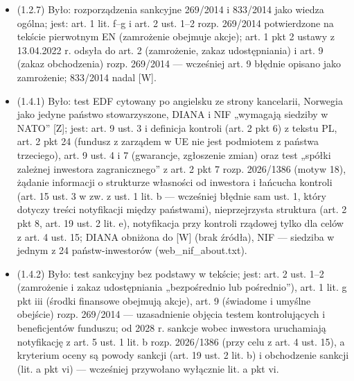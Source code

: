 \documentclass[12pt,a4paper]{report}
\begin{document}
\begin{itemize}
  \item (1.2.7) Było: rozporządzenia sankcyjne 269/2014 i 833/2014 jako wiedza ogólna; jest: art. 1 lit. f–g i art. 2 ust. 1–2 rozp. 269/2014 potwierdzone na tekście pierwotnym EN (zamrożenie obejmuje akcje); art. 1 pkt 2 ustawy z 13.04.2022 r. odsyła do art. 2 (zamrożenie, zakaz udostępniania) i art. 9 (zakaz obchodzenia) rozp. 269/2014 — wcześniej art. 9 błędnie opisano jako zamrożenie; 833/2014 nadal [W].
  \item (1.4.1) Było: test EDF cytowany po angielsku ze strony kancelarii, Norwegia jako jedyne państwo stowarzyszone, DIANA i NIF „wymagają siedziby w NATO” [Z]; jest: art. 9 ust. 3 i definicja kontroli (art. 2 pkt 6) z tekstu PL, art. 2 pkt 24 (fundusz z zarządem w UE nie jest podmiotem z państwa trzeciego), art. 9 ust. 4 i 7 (gwarancje, zgłoszenie zmian) oraz test „spółki zależnej inwestora zagranicznego” z art. 2 pkt 7 rozp. 2026/1386 (motyw 18), żądanie informacji o strukturze własności od inwestora i łańcucha kontroli (art. 15 ust. 3 w zw. z ust. 1 lit. b — wcześniej błędnie sam ust. 1, który dotyczy treści notyfikacji między państwami), nieprzejrzysta struktura (art. 2 pkt 8, art. 19 ust. 2 lit. e), notyfikacja przy kontroli rządowej tylko dla celów z art. 4 ust. 15; DIANA obniżona do [W] (brak źródła), NIF — siedziba w jednym z 24 państw-inwestorów (web\_nif\_about.txt).
  \item (1.4.2) Było: test sankcyjny bez podstawy w tekście; jest: art. 2 ust. 1–2 (zamrożenie i zakaz udostępniania „bezpośrednio lub pośrednio”), art. 1 lit. g pkt iii (środki finansowe obejmują akcje), art. 9 (świadome i umyślne obejście) rozp. 269/2014 — uzasadnienie objęcia testem kontrolujących i beneficjentów funduszu; od 2028 r. sankcje wobec inwestora uruchamiają notyfikację z art. 5 ust. 1 lit. b rozp. 2026/1386 (przy celu z art. 4 ust. 15), a kryterium oceny są powody sankcji (art. 19 ust. 2 lit. b) i obchodzenie sankcji (lit. a pkt vi) — wcześniej przywołano wyłącznie lit. a pkt vi.

\end{itemize}
\end{document}
